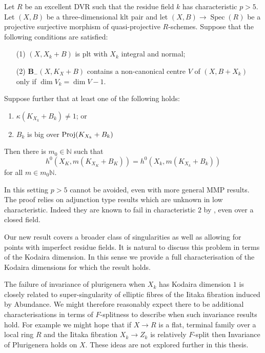 \documentclass[a4paper,12pt]{book}
\DeclareMathOperator{\Spec}{Spec}
\begin{document}
	\begin{theo}\label{Main_Abund2}
		Let $R$ be an excellent DVR such that the residue field $k$ has characteristic $p>5$.
		Let $(X,B)$ be a three-dimensional klt pair and let $(X,B)\to \Spec(R)$ be a projective surjective morphism of quasi-projective $R$-schemes.  Suppose that the following conditions are satisfied:
		
		\begin{enumerate}
			\item[(1)] $(X,X_{k}+B)$ is plt with $X_k$ integral and normal;
			\item[(2)] ${\mathbf{B}_{-}(X, K_{X}+B)}$ contains a non-canonical centre $V$ of $(X,B+X_{k})$ only if $\dim V_{k}=\dim V -1$.
		\end{enumerate}
		
		Suppose further that at least one of the following holds:
		\begin{enumerate}
			\item $\kappa(K_{X_{k}}+B_{k}) \neq 1$; or
			\item $B_{k}$ is big over $\textup{Proj}(K_{X_{k}}+B_{k})$
		\end{enumerate}	
		Then there is $m_{0} \in \mathbb{N}$ such that 
		$$h^{0}(X_{K},m(K_{X_{K}}+B_{K}))=h^{0}(X_{k},m(K_{X_{k}}+B_{k}))$$
		for all $m \in m_{0}\mathbb{N}$.
		
	\end{theo}
	
	In this setting $p>5$ cannot be avoided, even with more general MMP results. The proof relies on adjunction type results which are unknown in low characteristic. Indeed they are known to fail in characteristic $2$ by \cite{cascini2019purely}, even over a closed field.
	
	Our new result covers a broader class of singularities as well as allowing for points with imperfect residue fields. It is natural to discuss this problem in terms of the Kodaira dimension. In this sense we provide a full characterisation of the Kodaira dimensions for which the result holds.
	
	The failure of invariance of plurigenera when $X_{k}$ has Kodaira dimension $1$ is closely related to super-singularity of elliptic fibres of the Iitaka fibration induced by Abundance. We might therefore reasonably expect there to be additional characterisations in terms of $F$-splitness to describe when such invariance results hold. For example we might hope that if $X \to R$ is a flat, terminal family over a local ring $R$ and the Iitaka fibration $X_{k}\to Z_{k}$ is relatively $F$-split then Invariance of Plurigenera holds on $X$. These ideas are not explored further in this thesis.
	
\end{document}
